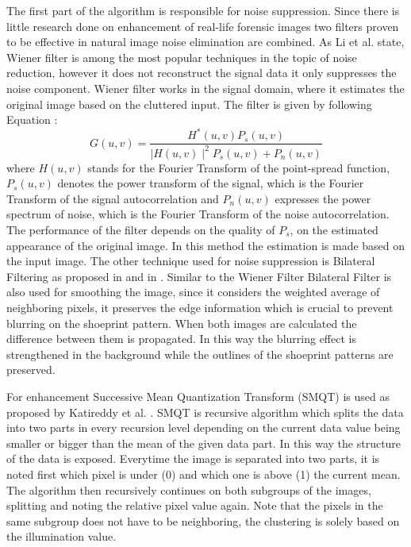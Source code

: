 \documentclass[draft,final]{vutinfth} %
\begin{document}
\par
The first part of the algorithm is responsible for noise suppression.
Since there is little research done on enhancement of real-life forensic images two filters proven to be effective in natural image noise elimination are combined.
As Li et al. \cite{li2014rapid} state, Wiener filter is among the most popular techniques in the topic of noise reduction, however it does not reconstruct the signal data it only suppresses the noise component.
Wiener filter works in the signal domain, where it estimates the original image based on the cluttered input. 
The filter is given by following Equation \cite{Win}:
\[ G(u, v) = \frac{H^*(u,v) P_s(u, v)}{\mid H(u,v)\mid ^2 P_s (u, v) + P_n (u, v)}  \]
where $H(u,v)$ stands for the Fourier Transform of the point-spread function, $P_s (u,v)$ denotes the power transform of the signal, which is the Fourier Transform of the signal autocorrelation and $P_n(u,v)$ expresses the power spectrum of noise, which is the Fourier Transform of the noise autocorrelation.
The performance of the filter depends on the quality of $P_s$, on the estimated appearance of the original image.
In this method the estimation is made based on the input image.
The other technique used for noise suppression is Bilateral Filtering as proposed in \cite{huang2013self} and in \cite{zhang2016simultaneous}.
Similar to the Wiener Filter Bilateral Filter is also used for smoothing the image, since it considers the weighted average of neighboring pixels, it preserves the edge information which is crucial to prevent blurring on the shoeprint pattern. 
When both images are calculated the difference between them is propagated.
In this way the blurring effect is strengthened in the background while the outlines of the shoeprint patterns are preserved.
\par
For enhancement Successive Mean Quantization Transform (SMQT) \cite{nilsson2013smqt} is used as proposed by Katireddy et al. \cite{katireddy2017novel}.
SMQT is recursive algorithm which splits the data into two parts in every recursion level depending on the current data value being smaller or bigger than the mean of the given data part.
In this way the structure of the data is exposed.
Everytime the image is separated into two parts, it is noted first which pixel is under (0) and which one is above (1) the current mean.
The algorithm then recursively continues on both subgroups of the images, splitting and noting the relative pixel value again.
Note that the pixels in the same subgroup does not have to be neighboring, the clustering is solely based on the illumination value.
\end{document}
